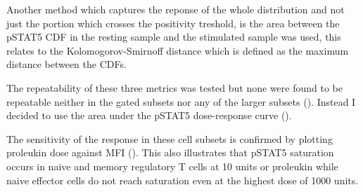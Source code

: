 Another method which captures the reponse of the whole distribution and not just the portion which crosses the positivity treshold,
is the area between the pSTAT5 CDF in the resting sample and the stimulated sample was used,
this relates to the Kolomogorov-Smirnoff distance which is defined as the maximum distance between the CDFs.


The repeatability of these three metrics was tested but none were found to be repeatable neither in the gated subsets nor any of the larger subsets ().
Instead I decided to use the area under the pSTAT5 dose-response curve ().



The sensitivity of the response in these cell subsets is confirmed by plotting proleukin dose against MFI ().
This also illustrates that pSTAT5 saturation occurs in naive and memory regulatory T cells at 10 units or proleukin while naive effector cells do not reach
saturation even at the highest dose of 1000 units.
 



